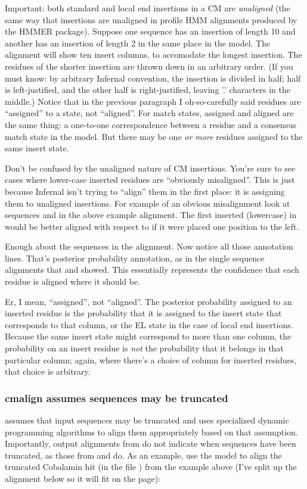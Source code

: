 Important: both standard and local end insertions in a CM are
\emph{unaligned} (the same way that insertions are unaligned in
profile HMM alignments produced by the HMMER package). Suppose one
sequence has an insertion of length 10 and another has an insertion of
length 2 in the same place in the model. The alignment will show ten
insert columns, to accomodate the longest insertion.  The residues of
the shorter insertion are thrown down in an arbitrary order. (If you
must know: by arbitrary Infernal convention, the insertion is divided
in half; half is left-justified, and the other half is
right-justified, leaving '.' characters in the middle.)  Notice that
in the previous paragraph I oh-so-carefully said residues are
``assigned'' to a state, not ``aligned''. For match states, assigned
and aligned are the same thing: a one-to-one correspondence between a
residue and a consensus match state in the model. But there may be one
\emph{or more} residues assigned to the same insert state.

Don't be confused by the unaligned nature of CM insertions. You're
sure to see cases where lower-case inserted residues are ``obviously
misaligned''. This is just because Infernal isn't trying to ``align''
them in the first place: it is assigning them to unaligned
insertions. For example of an obvious misalignment look at sequences
 and  in the above example
alignment. The first inserted (lowercase)  in
 would be better aligned with respect to
 if it were placed one position to the left.

Enough about the sequences in the alignment. Now notice all those
 annotation lines. That's posterior probability annotation,
as in the single sequence alignments that  and
 showed. This essentially represents the confidence
that each residue is aligned where it should be.

Er, I mean, ``assigned'', not ``aligned''. The posterior probability
assigned to an inserted residue is the probability that it is assigned
to the insert state that corresponds to that column, or the EL state
in the case of local end insertions. Because the same insert state
might correspond to more than one column, the probability on an insert
residue is \emph{not} the probability that it belongs in that
particular column; again, where there's a choice of column for
inserted residues, that choice is arbitrary. 

\subsubsection{cmalign assumes sequences may be truncated}
 assumes that input sequences may be truncated and uses
specialized dynamic programming algorithms to align them appropriately
based on that assumption. Importantly, output
alignments from  do not indicate when sequences have
been truncated, as those from  and  do. As
an example, use the  model to align the
truncated Cobalamin hit (in the file )
from the  example above (I've split up the alignment
below so it will fit on the page):

